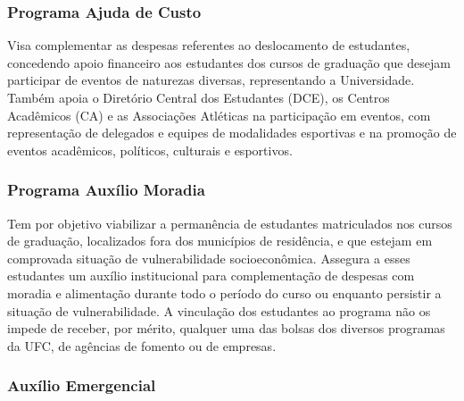 \subsubsection{Programa Ajuda de Custo}

Visa complementar as despesas referentes ao deslocamento de estudantes, concedendo apoio financeiro aos estudantes dos cursos de graduação que desejam participar de eventos de naturezas diversas, representando a Universidade. Também apoia o Diretório Central dos Estudantes (DCE), os Centros Acadêmicos (CA) e as Associações Atléticas na participação em eventos, com representação de delegados e equipes de modalidades esportivas e na promoção de eventos acadêmicos, políticos, culturais e esportivos.

\subsubsection{Programa Auxílio Moradia}


Tem por objetivo viabilizar a permanência de estudantes matriculados nos cursos de graduação, localizados fora dos municípios de residência, e que estejam em comprovada situação de vulnerabilidade socioeconômica. Assegura a esses estudantes um auxílio institucional para complementação de despesas com moradia e alimentação durante todo o período do curso ou enquanto persistir a situação de vulnerabilidade. A vinculação dos estudantes ao programa não os impede de receber, por mérito, qualquer uma das bolsas dos diversos programas da UFC, de agências de fomento ou de empresas.

\subsubsection{Auxílio Emergencial}

